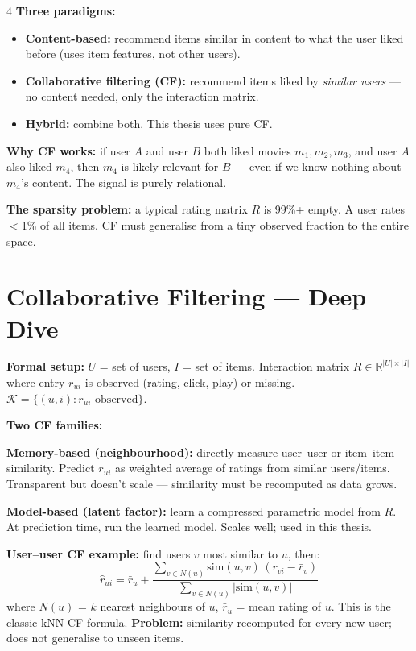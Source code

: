 \documentclass[9pt,a4paper,landscape]{article}
\begin{document}
\begin{multicols}{4}
\textbf{Three paradigms:}
\begin{itemize}
  \item \textbf{Content-based:} recommend items similar in content to what the user liked before (uses item features, not other users).
  \item \textbf{Collaborative filtering (CF):} recommend items liked by \emph{similar users} — no content needed, only the interaction matrix.
  \item \textbf{Hybrid:} combine both. This thesis uses pure CF.
\end{itemize}

\textbf{Why CF works:} if user $A$ and user $B$ both liked movies $m_1, m_2, m_3$, and user $A$ also liked $m_4$, then $m_4$ is likely relevant for $B$ — even if we know nothing about $m_4$'s content. The signal is purely relational.

\textbf{The sparsity problem:} a typical rating matrix $R$ is 99\%+ empty. A user rates $<$1\% of all items. CF must generalise from a tiny observed fraction to the entire space.

\section{Collaborative Filtering — Deep Dive}

\textbf{Formal setup:} $U$ = set of users, $I$ = set of items. Interaction matrix $R \in \mathbb{R}^{|U|\times|I|}$ where entry $r_{ui}$ is observed (rating, click, play) or missing. $\mathcal{K} = \{(u,i) : r_{ui}\text{ observed}\}$.

\textbf{Two CF families:}

\colorbox{secbg}{\parbox{\linewidth}{\small
\textbf{Memory-based (neighbourhood):} directly measure user--user or item--item similarity. Predict $r_{ui}$ as weighted average of ratings from similar users/items. Transparent but doesn't scale — similarity must be recomputed as data grows.

\textbf{Model-based (latent factor):} learn a compressed parametric model from $R$. At prediction time, run the learned model. Scales well; used in this thesis.
}}

\textbf{User--user CF example:} find users $v$ most similar to $u$, then:
\[
\hat{r}_{ui} = \bar{r}_u + \frac{\sum_{v\in N(u)} \text{sim}(u,v)\,(r_{vi}-\bar{r}_v)}{\sum_{v\in N(u)}|\text{sim}(u,v)|}
\]
where $N(u)$ = $k$ nearest neighbours of $u$, $\bar{r}_u$ = mean rating of $u$. This is the classic kNN CF formula. \textbf{Problem:} similarity recomputed for every new user; does not generalise to unseen items.


\end{multicols}
\end{document}
